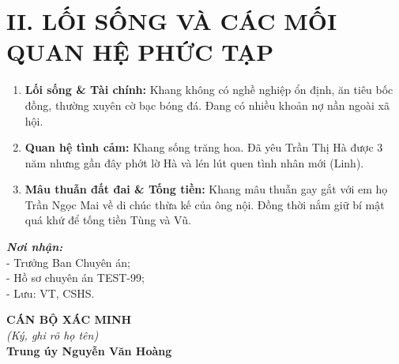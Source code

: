 \documentclass[12pt,a4paper]{article}
\begin{document}
\section*{II. LỐI SỐNG VÀ CÁC MỐI QUAN HỆ PHỨC TẠP}
\begin{enumerate}[label=\arabic*., leftmargin=1.5cm]
    \item \textbf{Lối sống \& Tài chính:} Khang không có nghề nghiệp ổn định, ăn tiêu bốc đồng, thường xuyên cờ bạc bóng đá. Đang có nhiều khoản nợ nần ngoài xã hội.
    \item \textbf{Quan hệ tình cảm:} Khang sống trăng hoa. Đã yêu Trần Thị Hà được 3 năm nhưng gần đây phớt lờ Hà và lén lút quen tình nhân mới (Linh).
    \item \textbf{Mâu thuẫn đất đai & Tống tiền:} Khang mâu thuẫn gay gắt với em họ Trần Ngọc Mai về di chúc thừa kế của ông nội. Đồng thời nắm giữ bí mật quá khứ để tống tiền Tùng và Vũ.
\end{enumerate}

\vspace{0.8cm}

\noindent
\begin{minipage}[t]{0.45\textwidth}
    \small
    \textbf{\textit{Nơi nhận:}}\\
    - Trưởng Ban Chuyên án;\\
    - Hồ sơ chuyên án TEST-99;\\
    - Lưu: VT, CSHS.
\end{minipage}
\hfill
\begin{minipage}[t]{0.5\textwidth}
    \begin{center}
        \small
        \textbf{CÁN BỘ XÁC MINH}\\
        \textit{(Ký, ghi rõ họ tên)}\\[1.5cm]
        \textbf{Trung úy Nguyễn Văn Hoàng}
    \end{center}
\end{minipage}
\end{document}
